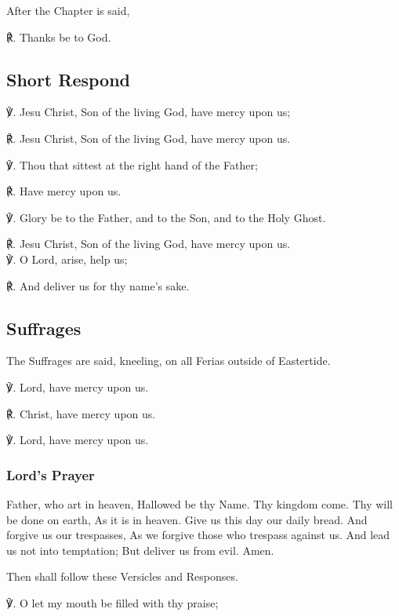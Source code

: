 \begin{multicols}{2}
\begin{rubric}
	After the Chapter is said,
\end{rubric}
℟. Thanks be to God.

\subsection{Short Respond}
℣. Jesu Christ, Son of the living God, have mercy upon us;

℟. Jesu Christ, Son of the living God, have mercy upon us.

℣. Thou that sittest at the right hand of the Father;

℟. Have mercy upon us.

℣. Glory be to the Father, and to the Son, and to the Holy Ghost.

℟. Jesu Christ, Son of the living God, have mercy upon us.\\

℣. O Lord, arise, help us;

℟. And deliver us for thy name’s sake.

\newcolumn

\subsection{Suffrages}
\begin{rubric}
	The Suffrages are said, kneeling, on all Ferias outside of Eastertide.
\end{rubric}
℣. Lord, have mercy upon us.

℟. Christ, have mercy upon us.

℣. Lord, have mercy upon us.

\subsubsection{Lord's Prayer}
 Father, who art in heaven, Hallowed be thy Name. Thy kingdom come. Thy will be done on earth, As it is in heaven. Give us this day our daily bread. And forgive us our trespasses, As we forgive those who trespass against us. And lead us not into temptation; But deliver us from evil. Amen.

\begin{rubric}
	Then shall follow these Versicles and Responses.
\end{rubric}

℣. O let my mouth be filled with thy praise;


\end{multicols}
